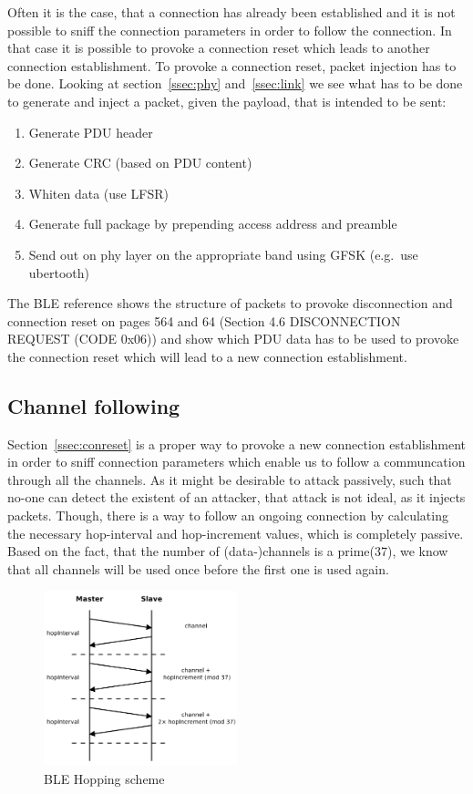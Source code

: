 \documentclass[conference]{IEEEtran}
\begin{document}
Often it is the case, that a connection has already been established and it is not possible to sniff the connection parameters in order to follow the connection. In that case it is possible to provoke a connection reset which leads to another connection establishment.
To provoke a connection reset, packet injection has to be done. Looking at section~\ref{ssec:phy} and~\ref{ssec:link} we see what has to be done to generate and inject a packet, given the payload, that is intended to be sent:

\begin{enumerate}
  \item Generate PDU header
  \item Generate CRC (based on PDU content)
  \item Whiten data (use LFSR)
  \item Generate full package by prepending access address and preamble
  \item Send out on phy layer on the appropriate band using GFSK (e.g.\ use ubertooth)
\end{enumerate}

The BLE reference shows the structure of packets to provoke disconnection and connection reset on pages 564 and 64 (Section 4.6 DISCONNECTION REQUEST (CODE 0x06)) and show which PDU data has to be used to provoke the connection reset which will lead to a new connection establishment.\cite[p. 564]{ble40}

\subsection{Channel following}
\label{channelfollowing}

Section~\ref{ssec:conreset} is a proper way to provoke a new connection establishment in order to sniff connection parameters which enable us to follow a communcation through all the channels. As it might be desirable to attack passively, such that no-one can detect the existent of an attacker, that attack is not ideal, as it injects packets. Though, there is a way to follow an ongoing connection by calculating the necessary hop-interval and hop-increment values, which is completely passive. Based on the fact, that the number of (data-)channels is a prime(37), we know that all channels will be used once before the first one is used again.

\begin{figure}
  \centering
    \includegraphics[width=0.5\textwidth]{hopping}
    \caption{BLE Hopping scheme \cite{lowenergylowsecurity} }
  \label{fig:hopping}
\end{figure}
\end{document}
